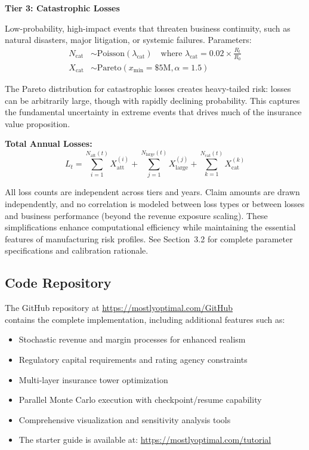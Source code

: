 \documentclass[11pt,letterpaper]{article}
\begin{document}
\vspace{\baselineskip}

\textbf{Tier 3: Catastrophic Losses}

Low-probability, high-impact events that threaten business continuity, such as natural disasters, major litigation, or systemic failures. Parameters:
\begin{align}
N_{\text{cat}} &\sim \text{Poisson}(\lambda_{\text{cat}}) \quad \text{where } \lambda_{\text{cat}} = 0.02 \times \frac{R_t}{R_0} \\
X_{\text{cat}} &\sim \text{Pareto}(x_{\text{min}} = \$5\text{M}, \alpha = 1.5)
\end{align}

The Pareto distribution for catastrophic losses creates heavy-tailed risk: losses can be arbitrarily large, though with rapidly declining probability. This captures the fundamental uncertainty in extreme events that drives much of the insurance value proposition.

\vspace{\baselineskip}

\textbf{Total Annual Losses:}
\begin{equation}
L_t = \sum_{i=1}^{N_{\text{att}}(t)} X_{\text{att}}^{(i)} + \sum_{j=1}^{N_{\text{large}}(t)} X_{\text{large}}^{(j)} + \sum_{k=1}^{N_{\text{cat}}(t)} X_{\text{cat}}^{(k)}
\end{equation}

All loss counts are independent across tiers and years. Claim amounts are drawn independently, and no correlation is modeled between loss types or between losses and business performance (beyond the revenue exposure scaling). These simplifications enhance computational efficiency while maintaining the essential features of manufacturing risk profiles. See Section~3.2 for complete parameter specifications and calibration rationale.

\subsection{Code Repository}\label{sec:code-repo}

The GitHub repository at \url{https://mostlyoptimal.com/GitHub}\\
contains the complete implementation, including additional features such as:
\begin{itemize}
    \item Stochastic revenue and margin processes for enhanced realism
    \item Regulatory capital requirements and rating agency constraints
    \item Multi-layer insurance tower optimization
    \item Parallel Monte Carlo execution with checkpoint/resume capability
    \item Comprehensive visualization and sensitivity analysis tools
    \item The starter guide is available at: \url{https://mostlyoptimal.com/tutorial}

\end{itemize}
\end{document}
